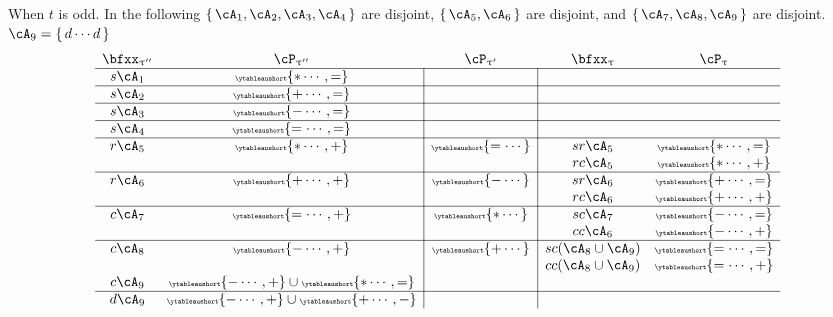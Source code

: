 \documentclass[12pt,a4paper]{amsart}
\numberwithin{equation}{section}
\theoremstyle{remark}
\let\ytb=\ytableaushort
\newcommand{\tytb}[1]{{\tiny\ytb{#1}}}
\def\uptaup{\uptau^{\prime}}
\def\uptaupp{\uptau^{\prime\prime}}
\begin{document}
When $t$ is odd.
In the following
$\set{\cA_{1},\cA_{2}, \cA_{3},\cA_{4}}$ are disjoint, $\set{\cA_{5},\cA_{6}}$ are disjoint,
and $\set{\cA_{7},\cA_{8},\cA_{9}}$ %
are disjoint.
$\cA_{9}=\set{d\cdots d}$
\begin{equation} \label{eq:B1-2}
\begin{array}{cc|c|cc}
  \bfxx_{\uptaupp} & \cP_{\uptaupp}         & \cP_{\uptaup} & \bfxx_{\uptau} & \cP_{\uptau} \\
  \hline
  s\cA_{1}              & \tytb{\ast\cdots ,=} &                                      \\
  \hline
  s\cA_{2}              & \tytb{+\cdots,=}          &                                     \\
  \hline
  s\cA_{3}              & \tytb{-\cdots,=}          &                                 \\
  \hline
  s\cA_{4}              & \tytb{=\cdots,=} &                                      \\
  \hline
  r\cA_{5}              & \tytb{\ast\cdots,+} & \tytb{=\cdots}  & sr\cA_{5} & \tytb{\ast\cdots,=}                      \\
                        &                    &                & rc\cA_{5} &\tytb{\ast\cdots,+}                         \\
  \hline
  r\cA_{6}              & \tytb{+\cdots,+} & \tytb{-\cdots}    & sr\cA_{6} &  \tytb{+\cdots,=}                    \\
                        &                    &                & rc\cA_{6} &\tytb{+\cdots,+}                          \\
  \hline
  c\cA_{7}              & \tytb{=\cdots,+}          & \tytb{\ast\cdots} & sc\cA_{7} & \tytb{-\cdots,=}                                        \\
                        &                    &                & cc\cA_{6} &\tytb{-\cdots,+}                                \\
  \hline
  c\cA_{8}              & \tytb{-\cdots,+}          & \tytb{+\cdots} & sc(\cA_{8}\cup \cA_{9}) &\tytb{=\cdots,=}             \\
                        &                    &                & cc(\cA_{8}\cup \cA_{9}) &\tytb{=\cdots,+}                                   \\
  c\cA_{9}              & \tytb{-\cdots,+}\cup \tytb{\ast\cdots,=} & \\
  \hline
  d\cA_{9}              & \tytb{-\cdots,+}\cup \tytb{+\cdots,-}  &

\end{array}
\end{equation}
\end{document}
